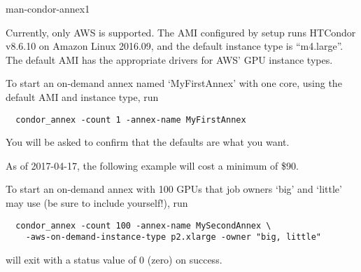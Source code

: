 \begin{ManPage}{}{man-condor-annex}{1}
\GenRem

Currently, only AWS is supported.  The AMI configured by setup runs
HTCondor v8.6.10 on Amazon Linux 2016.09, and the default instance type
is ``m4.large''.  The default AMI has the appropriate drivers for AWS'
GPU instance types.

\Examples

To start an on-demand annex named `MyFirstAnnex' with one core,
using the default AMI and instance type, run

\begin{verbatim}
  condor_annex -count 1 -annex-name MyFirstAnnex
\end{verbatim}

You will be asked to confirm that the defaults are what you want.

As of 2017-04-17, the following example will cost a minimum of \$90.

To start an on-demand annex with 100 GPUs that job owners `big' and `little'
may use (be sure to include yourself!), run

\begin{verbatim}
  condor_annex -count 100 -annex-name MySecondAnnex \
    -aws-on-demand-instance-type p2.xlarge -owner "big, little"
\end{verbatim}

\ExitStatus

 will exit with a status value of 0 (zero) on success.

\end{ManPage}
